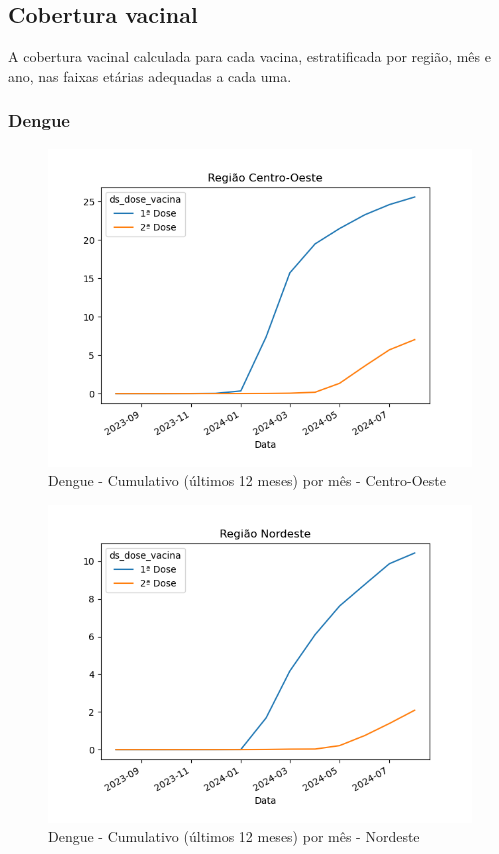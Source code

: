 \documentclass[12pt]{article}
\begin{document}
\subsection{Cobertura vacinal}
A cobertura vacinal calculada para cada vacina, estratificada por região, mês e ano, nas faixas etárias adequadas a cada uma.

\subsubsection{Dengue}
\begin{figure}[H]
    \centering
    \includegraphics[width=0.85\linewidth]{imagens/Dengue-Centro-Oeste-Cumulativo-mes}
    \caption{Dengue - Cumulativo (últimos 12 meses) por mês - Centro-Oeste}
    \label{fig:dengue-centro-oeste-cumulativo}
\end{figure}
\begin{figure}[H]
    \centering
    \includegraphics[width=0.85\linewidth]{imagens/Dengue-Nordeste-Cumulativo-mes}
    \caption{Dengue - Cumulativo (últimos 12 meses) por mês - Nordeste}
    \label{fig:dengue-nordeste-cumulativo-mes}
\end{figure}
\end{document}
